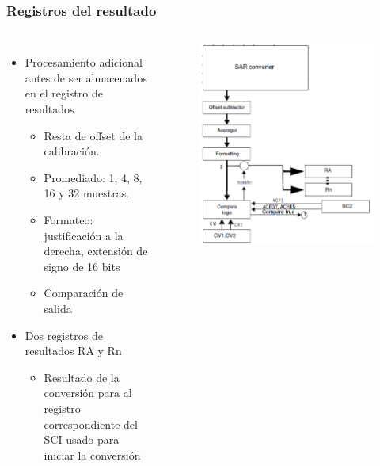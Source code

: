 \documentclass[10.5pt,scale=1.0,t,aspectratio=169,hyperref={pdfpagelabels=false}]{beamer}
\begin{document}
\begin{frame}
	\frametitle{Registros del resultado}
	{\small
		\begin{columns}
			\begin{itemize}
				\setlength\itemsep{0em}
				\item Procesamiento adicional antes de ser almacenados en el registro de resultados
				\begin{itemize}
					\item Resta de offset de la calibración.
					\item Promediado: 1, 4, 8, 16 y 32 muestras.
					\item Formateo: justificación a la derecha, extensión de signo de 16 bits
					\item Comparación de salida
				\end{itemize}
				\item Dos registros de resultados RA y Rn 
				\begin{itemize}
					\item Resultado de la conversión para al registro correspondiente del SCI usado para iniciar la conversión
				\end{itemize}
			\end{itemize}
			
			\begin{figure}
				\centering
				\includegraphics[scale=0.25]{fig_RegisterRA}
			\end{figure}
		\end{columns}
	}
\end{frame}
\end{document}
